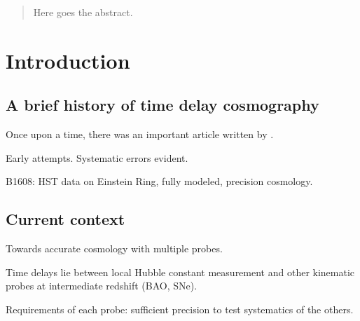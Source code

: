 \date{Received: date / Accepted: date}

\maketitle


\begin{abstract}

Here goes the abstract.


\end{abstract}


\section{Introduction}
\label{sec:intro}


\subsection{A brief history of time delay cosmography}
\label{sec:history}

Once upon a time, there was an important article written by \citet{Ref64}.

Early attempts. Systematic errors evident.

B1608: HST data on Einstein Ring, fully modeled, precision cosmology.


\subsection{Current context}
\label{sec:context}

Towards accurate cosmology with multiple probes.

Time delays lie between local Hubble constant measurement and other
kinematic probes at intermediate redshift (BAO, SNe).

Requirements of each probe: sufficient precision to test
systematics of the others.

